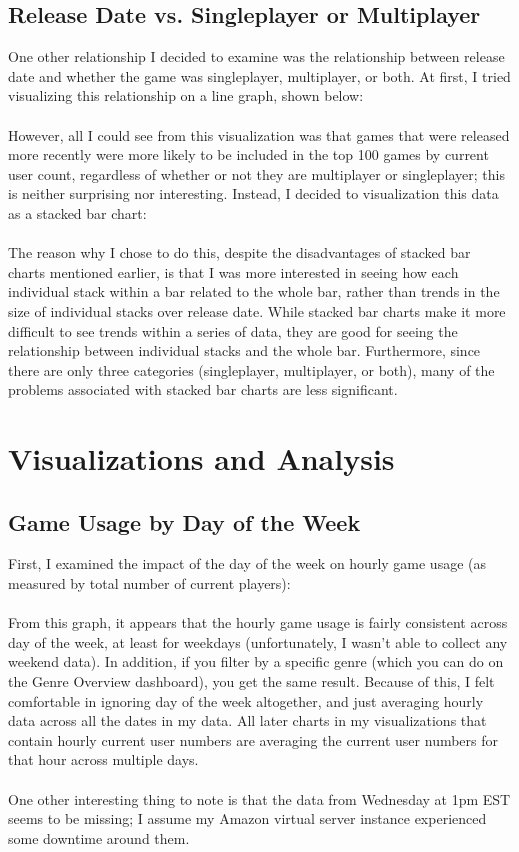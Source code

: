 \documentclass[pdftex,12pt,a4paper]{article}
\begin{document}
\subsection{Release Date vs. Singleplayer or Multiplayer}
One other relationship I decided to examine was the relationship between release date and whether the game was singleplayer, multiplayer, or both. At first, I tried visualizing this relationship on a line graph, shown below: \\ \\

However, all I could see from this visualization was that games that were released more recently were more likely to be included in the top 100 games by current user count, regardless of whether or not they are multiplayer or singleplayer; this is neither surprising nor interesting. Instead, I decided to visualization this data as a stacked bar chart: \\ \\

The reason why I chose to do this, despite the disadvantages of stacked bar charts mentioned earlier, is that I was more interested in seeing how each individual stack within a bar related to the whole bar, rather than trends in the size of individual stacks over release date. While stacked bar charts make it more difficult to see trends within a series of data, they are good for seeing the relationship between individual stacks and the whole bar. Furthermore, since there are only three categories (singleplayer, multiplayer, or both), many of the problems associated with stacked bar charts are less significant. 

\section{Visualizations and Analysis}
\subsection{Game Usage by Day of the Week}
First, I examined the impact of the day of the week on hourly game usage (as measured by total number of current players): \\ \\

From this graph, it appears that the hourly game usage is fairly consistent across day of the week, at least for weekdays (unfortunately, I wasn't able to collect any weekend data). In addition, if you filter by a specific genre (which you can do on the Genre Overview dashboard), you get the same result. Because of this, I felt comfortable in ignoring day of the week altogether, and just averaging hourly data across all the dates in my data. All later charts in my visualizations that contain hourly current user numbers are averaging the current user numbers for that hour across multiple days. \\ \\
One other interesting thing to note is that the data from Wednesday at 1pm EST seems to be missing; I assume my Amazon virtual server instance experienced some downtime around them.
\end{document}
